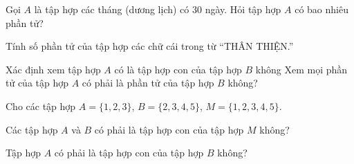\begin{vd}%
	Gọi $A$ là tập hợp các tháng (dương lịch) có $30$ ngày. Hỏi tập hợp $A$ có bao nhiêu phần tử?
\end{vd}

\begin{vd}%
	Tính số phần tử của tập hợp các chữ cái trong từ ``THÂN THIỆN.''
\end{vd}


	\begin{dang}{Xác định xem tập hợp $A$ có là tập hợp con của tập hợp $B$ không}
		Xem mọi phần tử của tập hợp $A$ có phải là phần tử của tập hợp $B$ không?
	\end{dang}
	
\begin{vd}%
	Cho các tập hợp $A = \{1, 2, 3\}$, $B = \{2, 3, 4, 5\}$, $M = \{1, 2, 3, 4, 5\}$.
	\begin{enumEX}{1}
		\item Các tập hợp $A$ và $B$ có phải là tập hợp con của tập hợp $M$ không?
		\item Tập hợp $A$ có phải là tập hợp con của tập hợp $B$ không?
	\end{enumEX}	
\end{vd}

